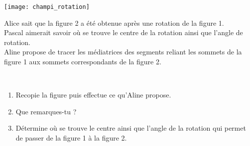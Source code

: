 \begin{activite}
\begin{partie}
 \begin{minipage}[c]{0.28\linewidth}
  \texttt{[image: champi\_rotation]}
  \end{minipage} \hfill%
  \begin{minipage}[c]{0.58\linewidth}
Alice sait que la figure 2 a été obtenue après une rotation de la figure 1. \\[0.5em]
Pascal aimerait savoir où se trouve le centre de la rotation ainsi que l'angle de rotation. \\[0.5em]
Aline propose de tracer les médiatrices des segments reliant les sommets de la figure 1 aux sommets correspondants de la figure 2.
  \end{minipage} \\
\begin{enumerate}
 \item Recopie la figure puis effectue ce qu'Aline propose.
 \item Que remarques-tu ?
 \item Détermine où se trouve le centre ainsi que l'angle de la rotation qui permet de passer de la figure 1 à la figure 2.
 \end{enumerate}
\end{partie}

\end{activite}

